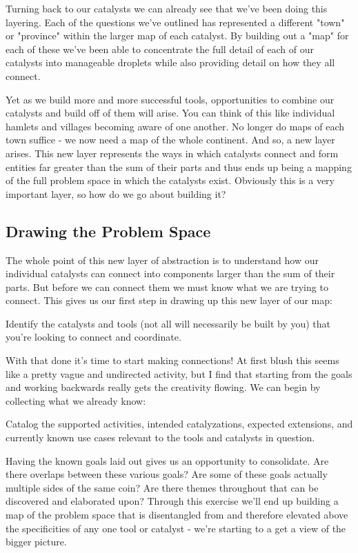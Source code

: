 \documentclass[10pt,a5paper]{book}
\begin{document}
Turning back to our catalysts we can already see that we've been doing this layering. Each of the questions we've outlined has represented a different "town" or "province" within the larger map of each catalyst. By building out a "map" for each of these we've been able to concentrate the full detail of each of our catalysts into manageable droplets while also providing detail on how they all connect. 

Yet as we build more and more successful tools, opportunities to combine our catalysts and build off of them will arise. You can think of this like individual hamlets and villages becoming aware of one another. No longer do maps of each town suffice - we now need a map of the whole continent. And so, a new layer arises. This new layer represents the ways in which catalysts connect and form entities far greater than the sum of their parts and thus ends up being a mapping of the full problem space in which the catalysts exist. Obviously this is a very important layer, so how do we go about building it?

\subsection{Drawing the Problem Space}
The whole point of this new layer of abstraction is to understand how our individual catalysts can connect into components larger than the sum of their parts. But before we can connect them we must know what we are trying to connect. This gives us our first step in drawing up this new layer of our map:\linebreak

Identify the catalysts and tools (not all will necessarily be built by you) that you're looking to connect and coordinate.\linebreak

With that done it's time to start making connections! At first blush this seems like a pretty vague and undirected activity, but I find that starting from the goals and working backwards really gets the creativity flowing. We can begin by collecting what we already know:\linebreak

Catalog the supported activities, intended catalyzations, expected extensions, and currently known use cases relevant to the tools and catalysts in question.\linebreak

Having the known goals laid out gives us an opportunity to consolidate. Are there overlaps between these various goals? Are some of these goals actually multiple sides of the same coin? Are there themes throughout that can be discovered and elaborated upon? Through this exercise we'll end up building a map of the problem space that is disentangled from and therefore elevated above the specificities of any one tool or catalyst - we're starting to a get a view of the bigger picture.\linebreak 
\end{document}
